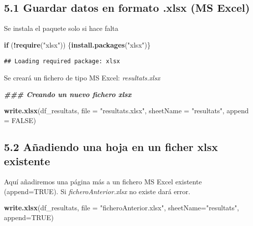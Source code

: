 \documentclass[
]{article}
\newenvironment{Shaded}{\begin{snugshade}}{\end{snugshade}}
\newcommand{\AttributeTok}[1]{\textcolor[rgb]{0.13,0.29,0.53}{#1}}
\newcommand{\ConstantTok}[1]{\textcolor[rgb]{0.56,0.35,0.01}{#1}}
\newcommand{\ControlFlowTok}[1]{\textcolor[rgb]{0.13,0.29,0.53}{\textbf{#1}}}
\newcommand{\DocumentationTok}[1]{\textcolor[rgb]{0.56,0.35,0.01}{\textbf{\textit{#1}}}}
\newcommand{\FunctionTok}[1]{\textcolor[rgb]{0.13,0.29,0.53}{\textbf{#1}}}
\newcommand{\NormalTok}[1]{#1}
\newcommand{\SpecialCharTok}[1]{\textcolor[rgb]{0.81,0.36,0.00}{\textbf{#1}}}
\newcommand{\StringTok}[1]{\textcolor[rgb]{0.31,0.60,0.02}{#1}}
\begin{document}
\hypertarget{guardar-datos-en-formato-.xlsx-ms-excel}{%
\subsection{5.1 Guardar datos en formato .xlsx (MS
Excel)}\label{guardar-datos-en-formato-.xlsx-ms-excel}}

Se instala el paquete solo si hace falta

\begin{Shaded}
\begin{Highlighting}[]
\ControlFlowTok{if}\NormalTok{ (}\SpecialCharTok{!}\FunctionTok{require}\NormalTok{(}\StringTok{"xlsx"}\NormalTok{)) \{}\FunctionTok{install.packages}\NormalTok{(}\StringTok{"xlsx"}\NormalTok{)\}}
\end{Highlighting}
\end{Shaded}

\begin{verbatim}
## Loading required package: xlsx
\end{verbatim}

Se creará un fichero de tipo MS Excel: \emph{resultats.xlsx}

\begin{Shaded}
\begin{Highlighting}[]
\DocumentationTok{\#\#\# Creando un nuevo fichero xlsx}

\FunctionTok{write.xlsx}\NormalTok{(df\_resultats, }\AttributeTok{file =} \StringTok{"resultats.xlsx"}\NormalTok{, }\AttributeTok{sheetName =} \StringTok{"resultats"}\NormalTok{, }\AttributeTok{append =} \ConstantTok{FALSE}\NormalTok{)}
\end{Highlighting}
\end{Shaded}

\hypertarget{auxf1adiendo-una-hoja-en-un-ficher-xlsx-existente}{%
\subsection{5.2 Añadiendo una hoja en un ficher xlsx
existente}\label{auxf1adiendo-una-hoja-en-un-ficher-xlsx-existente}}

Aquí añadiremos una página más a un fichero MS Excel existente
(append=TRUE). Si \emph{ficheroAnterior.xlsx} no existe dará error.

\begin{Shaded}
\begin{Highlighting}[]
\FunctionTok{write.xlsx}\NormalTok{(df\_resultats, }\AttributeTok{file =} \StringTok{"ficheroAnterior.xlsx"}\NormalTok{, }\AttributeTok{sheetName=}\StringTok{"resultats"}\NormalTok{, }\AttributeTok{append=}\ConstantTok{TRUE}\NormalTok{)}
\end{Highlighting}
\end{Shaded}
\end{document}
